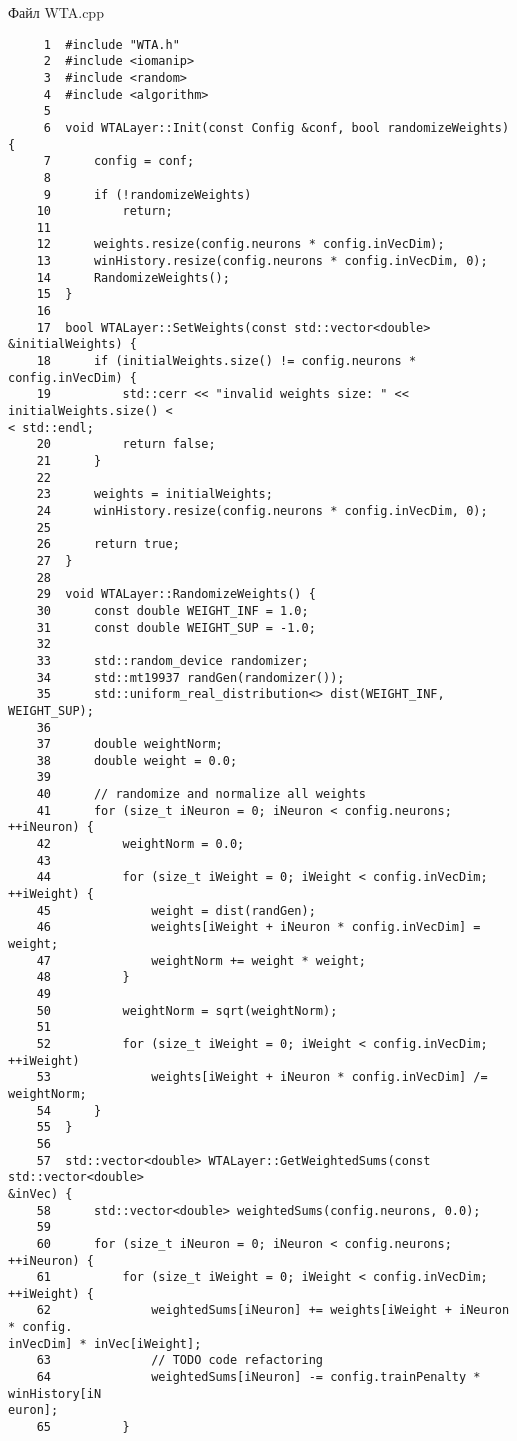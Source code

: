 Файл WTA.cpp
\begin{verbatim}
     1	#include "WTA.h"
     2	#include <iomanip>
     3	#include <random>
     4	#include <algorithm>
     5	
     6	void WTALayer::Init(const Config &conf, bool randomizeWeights) {
     7	    config = conf;
     8	
     9	    if (!randomizeWeights)
    10	        return;
    11	
    12	    weights.resize(config.neurons * config.inVecDim);
    13	    winHistory.resize(config.neurons * config.inVecDim, 0);
    14	    RandomizeWeights();
    15	}
    16	
    17	bool WTALayer::SetWeights(const std::vector<double> &initialWeights) {
    18	    if (initialWeights.size() != config.neurons * config.inVecDim) {
    19	        std::cerr << "invalid weights size: " << initialWeights.size() <
< std::endl;
    20	        return false;
    21	    }
    22	
    23	    weights = initialWeights;
    24	    winHistory.resize(config.neurons * config.inVecDim, 0);
    25	
    26	    return true;
    27	}
    28	
    29	void WTALayer::RandomizeWeights() {
    30	    const double WEIGHT_INF = 1.0;
    31	    const double WEIGHT_SUP = -1.0;
    32	
    33	    std::random_device randomizer;
    34	    std::mt19937 randGen(randomizer());
    35	    std::uniform_real_distribution<> dist(WEIGHT_INF, WEIGHT_SUP);
    36	
    37	    double weightNorm;
    38	    double weight = 0.0;
    39	
    40	    // randomize and normalize all weights
    41	    for (size_t iNeuron = 0; iNeuron < config.neurons; ++iNeuron) {
    42	        weightNorm = 0.0;
    43	
    44	        for (size_t iWeight = 0; iWeight < config.inVecDim; ++iWeight) {
    45	            weight = dist(randGen);
    46	            weights[iWeight + iNeuron * config.inVecDim] = weight;
    47	            weightNorm += weight * weight;
    48	        }
    49	
    50	        weightNorm = sqrt(weightNorm);
    51	
    52	        for (size_t iWeight = 0; iWeight < config.inVecDim; ++iWeight)
    53	            weights[iWeight + iNeuron * config.inVecDim] /= weightNorm;
    54	    }
    55	}
    56	
    57	std::vector<double> WTALayer::GetWeightedSums(const std::vector<double> 
&inVec) {
    58	    std::vector<double> weightedSums(config.neurons, 0.0);
    59	    
    60	    for (size_t iNeuron = 0; iNeuron < config.neurons; ++iNeuron) {
    61	        for (size_t iWeight = 0; iWeight < config.inVecDim; ++iWeight) {
    62	            weightedSums[iNeuron] += weights[iWeight + iNeuron * config.
inVecDim] * inVec[iWeight];
    63	            // TODO code refactoring
    64	            weightedSums[iNeuron] -= config.trainPenalty * winHistory[iN
euron];
    65	        }

\end{verbatim}
